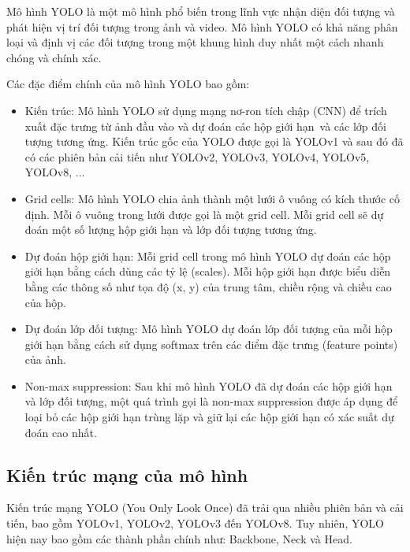 Mô hình YOLO là một mô hình phổ biến trong lĩnh vực nhận diện đối tượng và phát hiện vị trí đối tượng trong ảnh và video. Mô hình YOLO có khả năng phân loại và định vị các đối tượng trong một khung hình duy nhất một cách nhanh chóng và chính xác.

Các đặc điểm chính của mô hình YOLO bao gồm:
\begin{itemize}
    \item Kiến trúc: Mô hình YOLO sử dụng mạng nơ-ron tích chập (CNN) để trích xuất đặc trưng từ ảnh đầu vào và dự đoán các hộp giới hạn\ và các lớp đối tượng tương ứng. Kiến trúc gốc của YOLO được gọi là YOLOv1 và sau đó đã có các phiên bản cải tiến như YOLOv2, YOLOv3,  YOLOv4, YOLOv5, YOLOv8, ...
    \item Grid cells: Mô hình YOLO chia ảnh thành một lưới ô vuông có kích thước cố định. Mỗi ô vuông trong lưới được gọi là một grid cell. Mỗi grid cell sẽ dự đoán một số lượng hộp giới hạn và lớp đối tượng tương ứng.
    \item Dự đoán hộp giới hạn: Mỗi grid cell trong mô hình YOLO dự đoán các hộp giới hạn bằng cách dùng các tỷ lệ (scales). Mỗi hộp giới hạn được biểu diễn bằng các thông số như tọa độ (x, y) của trung tâm, chiều rộng và chiều cao của hộp.
    \item Dự đoán lớp đối tượng: Mô hình YOLO dự đoán lớp đối tượng của mỗi hộp giới hạn bằng cách sử dụng softmax trên các điểm đặc trưng (feature points) của ảnh.
    \item Non-max suppression: Sau khi mô hình YOLO đã dự đoán các hộp giới hạn và lớp đối tượng, một quá trình gọi là non-max suppression được áp dụng để loại bỏ các hộp giới hạn trùng lặp và giữ lại các hộp giới hạn có xác suất dự đoán cao nhất.
\end{itemize}


\subsection{Kiến trúc mạng của mô hình}

Kiến trúc mạng YOLO (You Only Look Once) đã trải qua nhiều phiên bản và cải tiến, bao gồm YOLOv1, YOLOv2, YOLOv3 đến YOLOv8. Tuy nhiên, YOLO hiện nay bao gồm các thành phần chính như: Backbone, Neck và Head.

